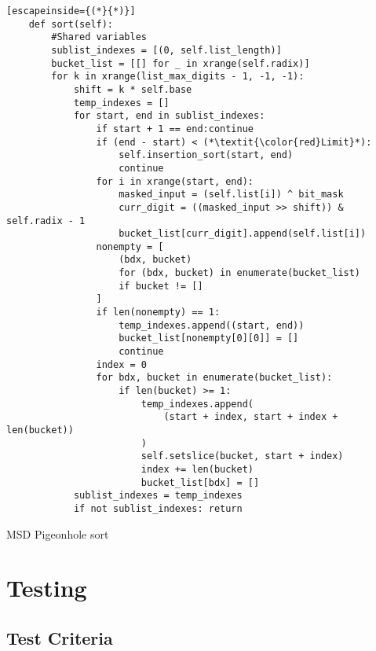 \documentclass[12pt]{article}
\begin{document}
\begin{table}[H]
	\lstset{
		language=python,
    numbers=left,
    stepnumber=1,
    showstringspaces=false,
    tabsize=3,
    breaklines=true,
    breakatwhitespace=false,}
	\centering
	\begin{lstlisting}[escapeinside={(*}{*)}]
	def sort(self):
		#Shared variables
		sublist_indexes = [(0, self.list_length)]
		bucket_list = [[] for _ in xrange(self.radix)]
		for k in xrange(list_max_digits - 1, -1, -1):
			shift = k * self.base
			temp_indexes = []
			for start, end in sublist_indexes:
				if start + 1 == end:continue
				if (end - start) < (*\textit{\color{red}Limit}*):
					self.insertion_sort(start, end)
					continue
				for i in xrange(start, end):
					masked_input = (self.list[i]) ^ bit_mask
					curr_digit = ((masked_input >> shift)) & self.radix - 1
					bucket_list[curr_digit].append(self.list[i])
				nonempty = [
					(bdx, bucket)
					for (bdx, bucket) in enumerate(bucket_list)
					if bucket != []
				]
				if len(nonempty) == 1:
					temp_indexes.append((start, end))
					bucket_list[nonempty[0][0]] = []
					continue
				index = 0
				for bdx, bucket in enumerate(bucket_list):
					if len(bucket) >= 1:
						temp_indexes.append(
							(start + index, start + index + len(bucket))
						)
						self.setslice(bucket, start + index)
						index += len(bucket)
						bucket_list[bdx] = []
			sublist_indexes = temp_indexes
			if not sublist_indexes: return
\end{lstlisting}
\caption*{MSD Pigeonhole sort}
\end{table}
\pagebreak
\section{Testing}
\subsection{Test Criteria}
\end{document}
